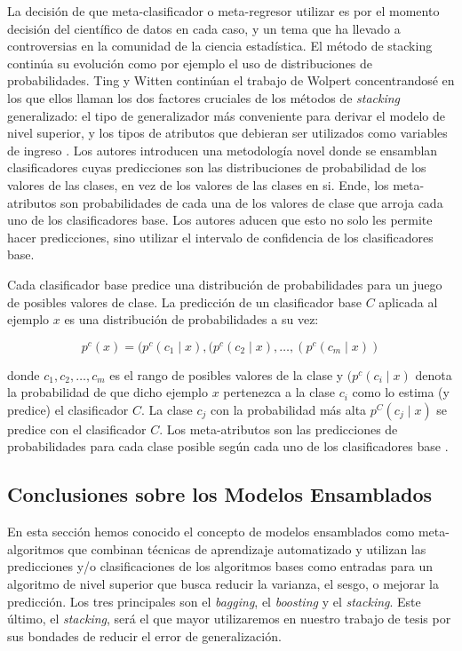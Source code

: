 La decisión de que meta-clasificador o meta-regresor utilizar es por el momento decisión del científico de datos en cada caso, y un tema que ha llevado a controversias en la comunidad de la ciencia estadística.  El método de stacking continúa su evolución como por ejemplo el uso de distribuciones de probabilidades. Ting y Witten continúan el trabajo de Wolpert concentrandosé en los que ellos llaman los dos factores cruciales de los métodos de \emph{stacking} generalizado: el tipo de generalizador más conveniente para derivar el modelo de nivel superior, y los tipos de atributos que debieran ser utilizados como variables de ingreso \cite{tingwitten}. Los autores introducen una metodología novel donde se ensamblan clasificadores cuyas predicciones son las distribuciones de probabilidad de los valores de las clases, en vez de los valores de las clases en si. Ende, los meta-atributos son probabilidades de cada una de los valores de clase que arroja cada uno de los clasificadores base. Los autores aducen que esto no solo les permite hacer predicciones, sino utilizar el intervalo de confidencia de los clasificadores base. 

Cada clasificador base predice una distribución de probabilidades para un juego de posibles valores de clase. La predicción de un clasificador base $C$ aplicada al ejemplo $x$ es una distribución de probabilidades a su vez:

\[ p^c(x) = (p^c(c_1 \mid x), (p^c(c_2 \mid x), \ldots, (p^c(c_m \mid x)) \]

donde ${c_{1}, c_{2}, \ldots, c_m}$ es el rango de posibles valores de la clase y $(p^c(c_i \mid x)$ denota la probabilidad de que dicho ejemplo $x$ pertenezca a la clase $c_i$ como lo estima (y predice) el clasificador $C$. La clase $c_j$ con la probabilidad más alta $p^C(c_j \mid x)$ se predice con el clasificador $C$. Los meta-atributos son las predicciones de probabilidades para cada clase posible según cada uno de los clasificadores base \cite{DzeroskiZenko}. 

\subsection{Conclusiones sobre los Modelos Ensamblados}
En esta sección hemos conocido el concepto de modelos ensamblados como meta-algoritmos que combinan técnicas de aprendizaje automatizado y utilizan las predicciones y/o clasificaciones de los algoritmos bases como entradas para un algoritmo de nivel superior que busca reducir la varianza, el sesgo, o mejorar la predicción. Los tres principales son el \emph{bagging}, el \emph{boosting} y el \emph{stacking}. Este último, el \emph{stacking}, será el que mayor utilizaremos en nuestro trabajo de tesis por sus bondades de reducir el error de generalización. 

